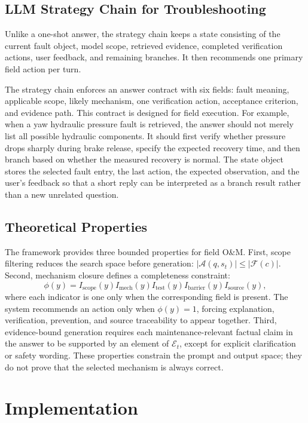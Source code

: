 \documentclass[lettersize,journal]{IEEEtran}
\begin{document}
\subsection{LLM Strategy Chain for Troubleshooting}
Unlike a one-shot answer, the strategy chain keeps a state consisting of the current fault object, model scope, retrieved evidence, completed verification actions, user feedback, and remaining branches. It then recommends one primary field action per turn.

The strategy chain enforces an answer contract with six fields: fault meaning, applicable scope, likely mechanism, one verification action, acceptance criterion, and evidence path. This contract is designed for field execution. For example, when a yaw hydraulic pressure fault is retrieved, the answer should not merely list all possible hydraulic components. It should first verify whether pressure drops sharply during brake release, specify the expected recovery time, and then branch based on whether the measured recovery is normal. The state object stores the selected fault entry, the last action, the expected observation, and the user's feedback so that a short reply can be interpreted as a branch result rather than a new unrelated question.

\subsection{Theoretical Properties}
The framework provides three bounded properties for field O\&M. First, scope filtering reduces the search space before generation: $|\mathcal{A}(q,s_t)|\leq|\mathcal{F}(c)|$. Second, mechanism closure defines a completeness constraint:
\begin{equation}
\phi(y)=I_{\mathrm{scope}}(y)I_{\mathrm{mech}}(y)I_{\mathrm{test}}(y)I_{\mathrm{barrier}}(y)I_{\mathrm{source}}(y),
\end{equation}
where each indicator is one only when the corresponding field is present. The system recommends an action only when $\phi(y)=1$, forcing explanation, verification, prevention, and source traceability to appear together. Third, evidence-bound generation requires each maintenance-relevant factual claim in the answer to be supported by an element of $\mathcal{E}_t$, except for explicit clarification or safety wording. These properties constrain the prompt and output space; they do not prove that the selected mechanism is always correct.

\section{Implementation}
\end{document}
